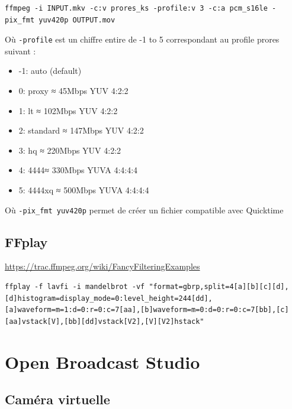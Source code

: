 \documentclass[
]{book}
\providecommand{\tightlist}{%
  \setlength{\itemsep}{0pt}\setlength{\parskip}{0pt}}
\begin{document}
\begin{verbatim}
ffmpeg -i INPUT.mkv -c:v prores_ks -profile:v 3 -c:a pcm_s16le -pix_fmt yuv420p OUTPUT.mov
\end{verbatim}

Où \texttt{-profile} est un chiffre entire de -1 to 5 correspondant au profile prores suivant :

\begin{itemize}
\tightlist
\item
  -1: auto (default)
\item
  0: proxy ≈ 45Mbps YUV 4:2:2
\item
  1: lt ≈ 102Mbps YUV 4:2:2
\item
  2: standard ≈ 147Mbps YUV 4:2:2
\item
  3: hq ≈ 220Mbps YUV 4:2:2
\item
  4: 4444≈ 330Mbps YUVA 4:4:4:4
\item
  5: 4444xq ≈ 500Mbps YUVA 4:4:4:4
\end{itemize}

Où \texttt{-pix\_fmt\ yuv420p} permet de créer un fichier compatible avec Quicktime

\hypertarget{ffplay}{%
\section{FFplay}\label{ffplay}}

\url{https://trac.ffmpeg.org/wiki/FancyFilteringExamples}

\begin{verbatim}
ffplay -f lavfi -i mandelbrot -vf "format=gbrp,split=4[a][b][c][d],[d]histogram=display_mode=0:level_height=244[dd],[a]waveform=m=1:d=0:r=0:c=7[aa],[b]waveform=m=0:d=0:r=0:c=7[bb],[c][aa]vstack[V],[bb][dd]vstack[V2],[V][V2]hstack"
\end{verbatim}

\hypertarget{obs}{%
\chapter{Open Broadcast Studio}\label{obs}}

\hypertarget{camuxe9ra-virtuelle-1}{%
\section{Caméra virtuelle}\label{camuxe9ra-virtuelle-1}}

\hypertarget{section-4}{%
\section{}\label{section-4}}
\end{document}

